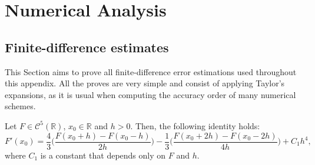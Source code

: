 \chapter{Numerical Analysis}
\label{anexo-na}

\section{Finite-difference estimates}
\label{anexo-fd}
This Section aims to prove all finite-difference error estimations 
used throughout this appendix.
All the proves are very simple and consist of applying Taylor's expansions,
as it is usual when computing the accuracy order of many numerical schemes.

\begin{lema}
	\label{lemma:fd-ppm-est1}
	Let $F \in \mathcal{C}^{5}(\mathbb{R})$, $x_0 \in \mathbb{R}$ and $h>0$.
	Then, the following identity holds:
	\begin{equation}	
		\label{lemma:fd-ppm-est1-eq0}
		F'(x_0) =  \frac{4}{3} \bigg(\frac{F(x_0+h) - F(x_0-h)}{2h}\bigg)
                      - \frac{1}{3} \bigg(\frac{F(x_0+2h) - F(x_0-2h)}{4h}\bigg)
		      + C_1h^4,
	\end{equation}
	where $C_1$ is a constant that depends only on $F$ and $h$.
\end{lema}

